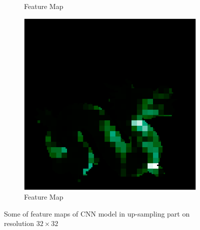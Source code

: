 \begin{figure}[H]
\begin{subfigure}[b]{0.19\linewidth}
		\caption{Feature Map}
	\end{subfigure}
	\begin{subfigure}[b]{0.19\linewidth}
		\includegraphics[width=\linewidth]{./Figures/feature_map_gcnn/feature_map_gcnn-cnn_2.png}
		\caption{Feature Map}
	\end{subfigure}
	
	\decoRule
	\caption{Some of feature maps of CNN model in up-sampling part on resolution $ 32\times32 $}
	\label{fig:detail-feature-maps}
\end{figure}



